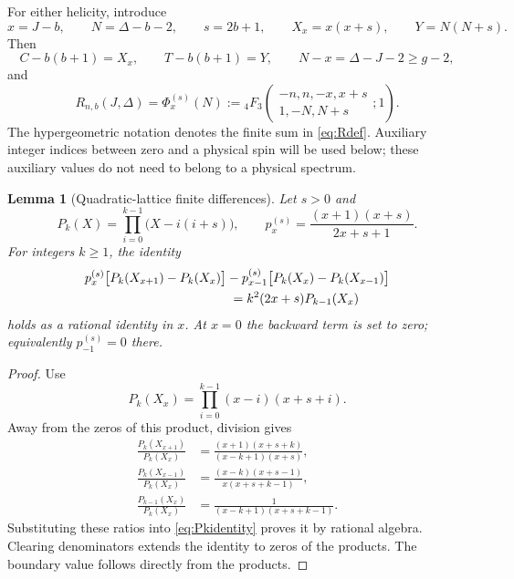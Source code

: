 \documentclass[11pt]{article}
\newtheorem{lemma}[theorem]{Lemma}
\theoremstyle{remark}
\numberwithin{equation}{section}
\newcommand{\Ph}{\Phi}
\begin{document}
For either helicity, introduce
\begin{equation}
 x=J-b,\qquad N=\Delta-b-2,\qquad s=2b+1,
 \qquad X_x=x(x+s),\qquad Y=N(N+s).
 \label{eq:shifted}
\end{equation}
Then
\begin{equation}
 C-b(b+1)=X_x,\qquad T-b(b+1)=Y,
 \qquad N-x=\Delta-J-2\ge g-2,
 \label{eq:shiftedphysical}
\end{equation}
and
\begin{equation}
 R_{n,b}(J,\Delta)
 =\Ph_x^{(s)}(N)
 :={}_4F_3\left(
 \begin{matrix}-n,n,-x,x+s\\1,-N,N+s\end{matrix};1\right).
 \label{eq:4F3}
\end{equation}
The hypergeometric notation denotes the finite sum in \eqref{eq:Rdef}.
Auxiliary integer indices between zero and a physical spin will be used
below; these auxiliary values do not need to belong to a physical spectrum.

\begin{lemma}[Quadratic-lattice finite differences]
\label{lem:factorial}
Let $s>0$ and
\begin{equation}
 P_k(X)=\prod_{i=0}^{k-1}\bigl(X-i(i+s)\bigr),\qquad
 p_x^{(s)}=\frac{(x+1)(x+s)}{2x+s+1}.
 \label{eq:Pk}
\end{equation}
For integers $k\ge1$, the identity
\begin{align}
 &p_x^{(s)}\bigl[P_k(X_{x+1})-P_k(X_x)\bigr]
 -p_{x-1}^{(s)}\bigl[P_k(X_x)-P_k(X_{x-1})\bigr]\notag\\
 &\hspace{40mm}=k^2(2x+s)P_{k-1}(X_x)
 \label{eq:Pkidentity}
\end{align}
holds as a rational identity in $x$. At $x=0$ the backward term is set to
zero; equivalently $p_{-1}^{(s)}=0$ there.
\end{lemma}

\begin{proof}
Use
\[
 P_k(X_x)=\prod_{i=0}^{k-1}(x-i)(x+s+i).
\]
Away from the zeros of this product, division gives
\begin{align*}
 \frac{P_k(X_{x+1})}{P_k(X_x)}
 &=\frac{(x+1)(x+s+k)}{(x-k+1)(x+s)},\\
 \frac{P_k(X_{x-1})}{P_k(X_x)}
 &=\frac{(x-k)(x+s-1)}{x(x+s+k-1)},\\
 \frac{P_{k-1}(X_x)}{P_k(X_x)}
 &=\frac1{(x-k+1)(x+s+k-1)}.
\end{align*}
Substituting these ratios into \eqref{eq:Pkidentity} proves it by rational
algebra. Clearing denominators extends the identity to zeros of the products.
The boundary value follows directly from the products.
\end{proof}
\end{document}
